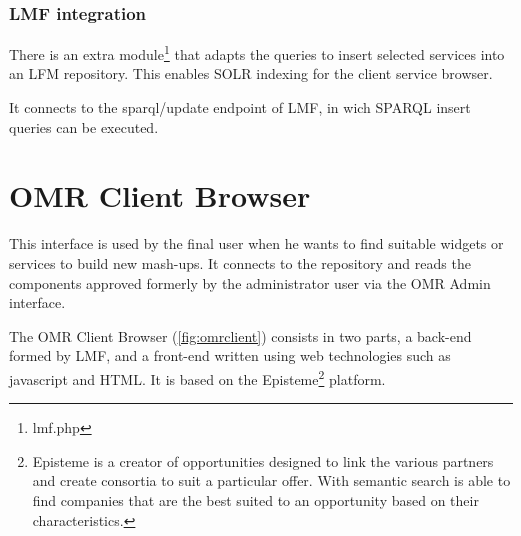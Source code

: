 \FloatBarrier

\subsubsection{LMF integration}
There is an extra module\footnote{lmf.php} that adapts the queries to insert selected services into an LFM repository. This enables SOLR indexing for the client service browser.

It connects to the sparql/update endpoint of LMF, in wich SPARQL insert queries can be executed.


\section{OMR Client Browser}
\label{sec:omrclientbrowser}

This interface is used by the final user when he wants to find suitable widgets or services to build new mash-ups. It connects to the repository and reads the components approved formerly by the administrator user via the OMR Admin interface.

The OMR Client Browser (\ref{fig:omrclient}) consists in two parts, a back-end formed by LMF, and a front-end written using web technologies such as javascript and HTML.
It is based on the Episteme\footnote{Episteme is a creator of opportunities designed to link the various partners and create consortia to suit a particular offer. With semantic search is able to find companies that are the best suited to an opportunity based on their characteristics.} platform.

